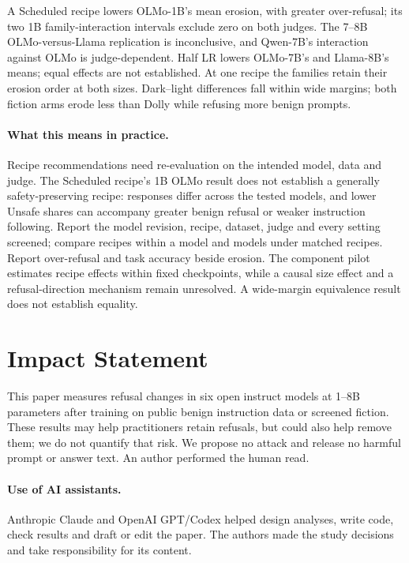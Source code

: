 \documentclass{article}
\begin{document}
A Scheduled recipe lowers OLMo-1B's mean erosion, with greater over-refusal;
its two 1B family-interaction intervals exclude zero on both judges. The
7--8B OLMo-versus-Llama replication is inconclusive, and Qwen-7B's interaction
against OLMo is judge-dependent. Half LR lowers OLMo-7B's and Llama-8B's means;
equal effects are not established. At one recipe the families retain their
erosion order at both sizes. Dark--light differences fall within wide margins;
both fiction arms erode less than Dolly while refusing more benign prompts.

\paragraph{What this means in practice.} Recipe recommendations need
re-evaluation on the intended model, data and judge. The Scheduled recipe's
1B OLMo result does not establish a generally safety-preserving recipe:
responses differ across the tested models, and lower Unsafe shares can
accompany greater benign refusal or weaker instruction following. Report
 the model revision, recipe, dataset, judge and every setting screened;
compare recipes within a model and models under matched recipes. Report
 over-refusal and task accuracy beside erosion. The component pilot estimates
recipe effects within fixed checkpoints, while a causal size effect and a
refusal-direction mechanism remain unresolved. A wide-margin equivalence
result does not establish equality.

\section*{Impact Statement}

This paper measures refusal changes in six open instruct models at 1--8B
parameters after training on public benign instruction data or screened
fiction. These results may help practitioners retain refusals, but could also
help remove them; we do not quantify that risk. We propose no attack and
release no harmful prompt or answer text. An author performed the human read.

\paragraph{Use of AI assistants.} Anthropic Claude and OpenAI GPT/Codex helped
design analyses, write code, check results and draft or edit the paper. The
authors made the study decisions and take responsibility for its content.
\end{document}
